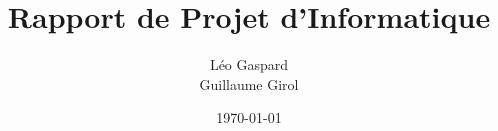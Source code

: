 \documentclass[11pt]{article}
\title{Rapport de Projet d'Informatique}
\date{\today}
\author{%
    L\'eo Gaspard\\
    Guillaume Girol
}
\begin{document}
\maketitle{}

\tableofcontents


\end{document}
